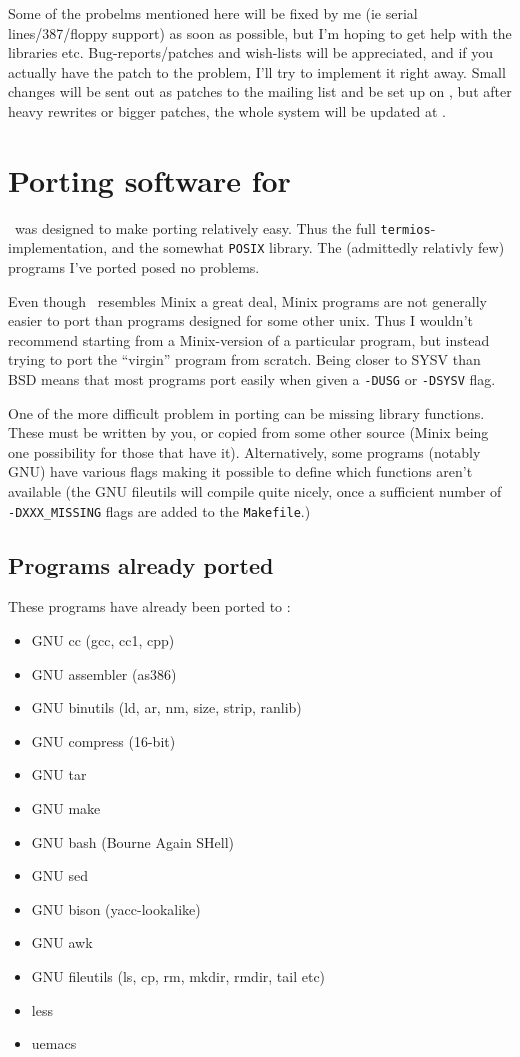 Some of the probelms mentioned here will be fixed by me (ie serial
lines/387/floppy support) as soon as possible, but I'm hoping to get
help with the libraries etc.  Bug-reports/patches and wish-lists will be
appreciated, and if you actually have the patch to the problem, I'll try
to implement it right away. Small changes will be sent out as patches to
the mailing list and be set up on \nic, but after heavy rewrites or
bigger patches, the whole system will be updated at \nic.

\section{Porting software for \Linux}

\Linux\ was designed to make porting relatively easy. Thus the full
{\tt termios}-implementation, and the somewhat {\tt POSIX} library. The
(admittedly relativly few) programs I've ported posed no problems.

Even though \Linux\ resembles Minix a great deal, Minix programs are not
generally easier to port than programs designed for some other unix.
Thus I wouldn't recommend starting from a Minix-version of a particular
program, but instead trying to port the ``virgin'' program from scratch.
Being closer to SYSV than BSD means that most programs port easily when
given a {\tt-DUSG} or {\tt-DSYSV} flag.

One of the more difficult problem in porting can be missing library
functions. These must be written by you, or copied from some other
source (Minix being one possibility for those that have it).
Alternatively, some programs (notably GNU) have various flags making it
possible to define which functions aren't available (the GNU fileutils
will compile quite nicely, once a sufficient number of
{\tt-DXXX\_MISSING} flags are added to the {\tt Makefile}.)

\subsection{Programs already ported}

These programs have already been ported to \Linux:
\begin{itemize}
\item GNU cc (gcc, cc1, cpp)
\item GNU assembler (as386)
\item GNU binutils (ld, ar, nm, size, strip, ranlib)
\item GNU compress (16-bit)
\item GNU tar
\item GNU make
\item GNU bash (Bourne Again SHell)
\item GNU sed
\item GNU bison (yacc-lookalike)
\item GNU awk
\item GNU fileutils (ls, cp, rm, mkdir, rmdir, tail etc)
\item less
\item uemacs
\end{itemize}

